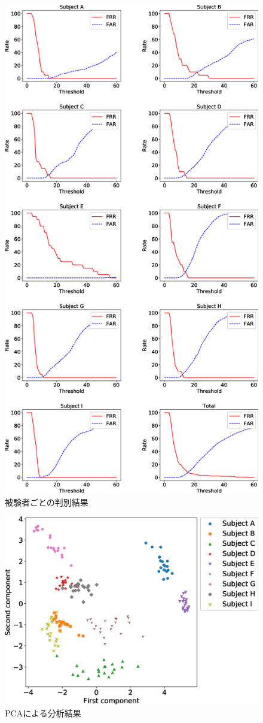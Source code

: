 \documentclass[Japanese,noauthor]{dicomopapers}
\begin{document}
\begin{figure}[!t]
  \centering
    \includegraphics[width=0.70\linewidth]{figure/EER.eps}
  \caption{被験者ごとの判別結果}
  \label{EER}
\end{figure}

\begin{figure}[!t]
  \centering
    \includegraphics[width=1\linewidth]{figure/PCA.eps}
  \caption{PCAによる分析結果}
  \label{PCA}
\end{figure}
\end{document}
